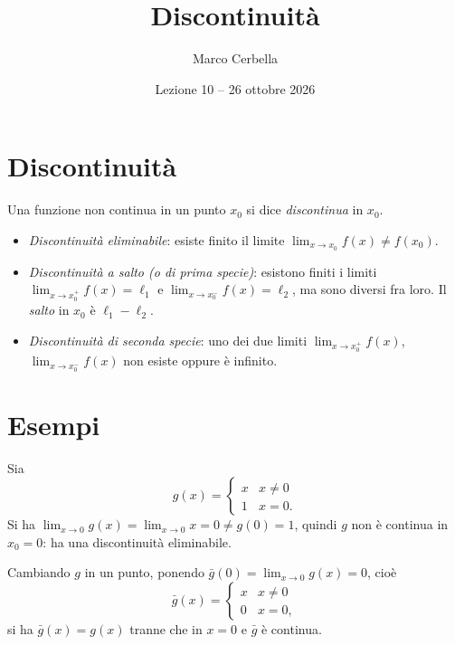 \documentclass[11pt,a4paper]{article}
\title{Discontinuità}
\author{Marco Cerbella}
\date{Lezione 10 -- 26 ottobre 2026}
\begin{document}
\maketitle

\section{Discontinuità}

Una funzione non continua in un punto $x_0$ si dice \emph{discontinua} in $x_0$.

\begin{definizione}
\begin{itemize}
    \item \emph{Discontinuità eliminabile}: esiste finito il limite $\displaystyle\lim_{x\to x_0} f(x) \neq f(x_0)$.
    \item \emph{Discontinuità a salto (o di prima specie)}: esistono finiti i limiti $\displaystyle\lim_{x\to x_0^+} f(x) = \ell_1$ e $\displaystyle\lim_{x\to x_0^-} f(x) = \ell_2$, ma sono diversi fra loro. Il \emph{salto} in $x_0$ è $\ell_1 - \ell_2$.
    \item \emph{Discontinuità di seconda specie}: uno dei due limiti $\displaystyle\lim_{x\to x_0^+} f(x)$, $\displaystyle\lim_{x\to x_0^-} f(x)$ non esiste oppure è infinito.
\end{itemize}
\end{definizione}

\section{Esempi}

\begin{esempio}
Sia
\[
g(x) = \begin{cases} x & x \neq 0 \\ 1 & x = 0 .\end{cases}
\]
Si ha $\displaystyle\lim_{x\to 0} g(x) = \lim_{x\to 0} x = 0 \neq g(0) = 1$, quindi $g$ non è continua in $x_0 = 0$: ha una discontinuità eliminabile.

Cambiando $g$ in un punto, ponendo $\bar g(0) = \lim_{x\to 0} g(x) = 0$, cioè
\[
\bar g(x) = \begin{cases} x & x \neq 0 \\ 0 & x = 0 ,\end{cases}
\]
si ha $\bar g(x) = g(x)$ tranne che in $x = 0$ e $\bar g$ è continua.
\end{esempio}
\end{document}
